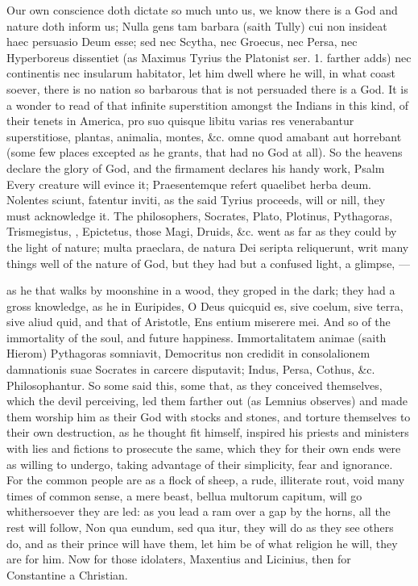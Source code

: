 {Our own conscience doth dictate so much unto us, we know there is a God
and nature doth inform us; Nulla gens tam barbara (saith Tully) cui non
insideat haec persuasio Deum esse; sed nec Scytha, nec Groecus, nec
Persa, nec Hyperboreus dissentiet (as Maximus Tyrius the Platonist ser.
1. farther adds) nec continentis nec insularum habitator, let him dwell
where he will, in what coast soever, there is no nation so barbarous
that is not persuaded there is a God. It is a wonder to read of that
infinite superstition amongst the Indians in this kind, of their tenets
in America, pro suo quisque libitu varias res venerabantur
superstitiose, plantas, animalia, montes, \&c. omne quod amabant aut
horrebant (some few places excepted as he grants, that had no God at
all). So the heavens declare the glory of God, and the firmament
declares his handy work, Psalm  Every creature will evince it;
Praesentemque refert quaelibet herba deum. Nolentes sciunt, fatentur
inviti, as the said Tyrius proceeds, will or nill, they must
acknowledge it. The philosophers, Socrates, Plato, Plotinus,
Pythagoras, Trismegistus, \Seneca, Epictetus, those Magi, Druids, \&c.
went as far as they could by the light of nature; multa
praeclara, de natura Dei seripta reliquerunt, writ many things well of
the nature of God, but they had but a confused light, a glimpse,
---

as he that walks by moonshine in a wood, they groped in the dark; they
had a gross knowledge, as he in Euripides, O Deus quicquid es, sive
coelum, sive terra, sive aliud quid, and that of Aristotle, Ens entium
miserere mei. And so of the immortality of the soul, and future
happiness. Immortalitatem animae (saith Hierom) Pythagoras somniavit,
Democritus non credidit in consolalionem damnationis suae Socrates in
carcere disputavit; Indus, Persa, Cothus, \&c. Philosophantur. So some
said this, some that, as they conceived themselves, which the devil
perceiving, led them farther out (as Lemnius observes) and made
them worship him as their God with stocks and stones, and torture
themselves to their own destruction, as he thought fit himself,
inspired his priests and ministers with lies and fictions to prosecute
the same, which they for their own ends were as willing to undergo,
taking advantage of their simplicity, fear and ignorance. For the
common people are as a flock of sheep, a rude, illiterate rout, void
many times of common sense, a mere beast, bellua multorum capitum, will
go whithersoever they are led: as you lead a ram over a gap by the
horns, all the rest will follow, Non qua eundum, sed qua itur,
they will do as they see others do, and as their prince will have them,
let him be of what religion he will, they are for him. Now for those
idolaters, Maxentius and Licinius, then for Constantine a Christian.

}
